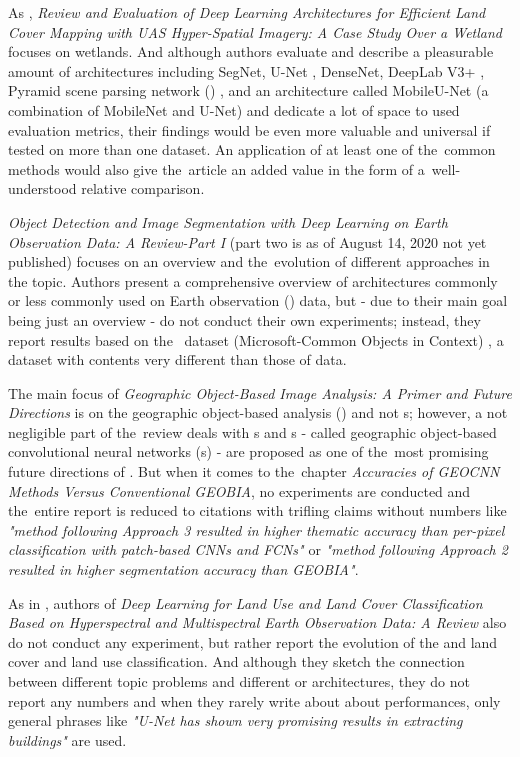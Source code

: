 As \cite{very-deep-cnn-lc}, \textit{Review and Evaluation of Deep Learning Architectures for Efficient Land Cover Mapping with UAS Hyper-Spatial Imagery: A Case Study Over a Wetland} focuses on wetlands. And although authors evaluate and describe a pleasurable amount of architectures including SegNet, U-Net \cite{u-net}, DenseNet, DeepLab V3+ \cite{deeplab}, Pyramid scene parsing network () \cite{pspnet}, and an architecture called MobileU-Net (a combination of MobileNet \cite{mobilenet} and U-Net) and dedicate a lot of space to used evaluation metrics, their findings would be even more valuable and universal if tested on more than one dataset. An application of at least one of the~common  methods would also give the~article an added value in the form of a~well-understood relative comparison.

\textit{Object Detection and Image Segmentation with Deep Learning on Earth Observation Data: A Review-Part I} (part two is as of August 14, 2020 not yet published) focuses on an overview and the~evolution of different approaches in the topic. Authors present a comprehensive overview of  architectures commonly or less commonly used on Earth observation () data, but - due to their main goal being just an overview - do not conduct their own experiments; instead, they report results based on the~ dataset (Microsoft-Common Objects in Context) \cite{coco}, a dataset with contents very different than those of  data.

The main focus of \textit{Geographic Object-Based Image Analysis: A Primer and Future Directions} is on the geographic object-based analysis () and not s; however, a not negligible part of the~review deals with s and s - called geographic object-based convolutional neural networks (s) - are proposed as one of the~most promising future directions of . But when it comes to the~chapter \textit{Accuracies of GEOCNN Methods Versus Conventional GEOBIA}, no experiments are conducted and the~entire report is reduced to citations with trifling claims without numbers like \textit{"method following Approach 3 resulted in higher thematic accuracy than per-pixel classification with patch-based CNNs and FCNs"} or \textit{"method following Approach 2 resulted in higher segmentation accuracy than GEOBIA"}.

As in \cite{review-dl-eo}, authors of \textit{Deep Learning for Land Use and Land Cover Classification Based on Hyperspectral and Multispectral Earth Observation Data: A Review} also do not conduct any experiment, but rather report the evolution of the  and land cover and land use classification. And although they sketch the connection between different topic problems and different  or  architectures, they do not report any numbers and when they rarely write about about performances, only general phrases like \textit{"U-Net has shown very promising results in extracting buildings"} are used.

